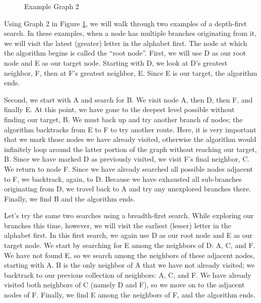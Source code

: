 \begin{figure}
\centering
{}
\caption{Example Graph 2}
\label{bfs_dfs}
\end{figure}

Using Graph 2 in Figure \ref{bfs_dfs}, we will walk through two examples of a depth-first search.
In these examples, when a node has multiple branches originating from it,
we will visit the latest (greater) letter in the alphabet first.
The node at which the algorithm begins is called the ``root node''.
First, we will use D as our root node and E as our target node.
Starting with D, we look at D's greatest neighbor, F, then at F's greatest
neighbor, E. Since E is our target, the algorithm ends.

Second, we start with A and search for B.
We visit node A, then D, then F, and finally E.
At this point, we have gone to the deepest level possible without finding our target, B.
We must back up and try another branch of nodes;
the algorithm backtracks from E to F to try another route.
Here, it is very important that we mark those nodes we have already visited,
otherwise the algorithm would infinitely loop around the latter portion of
the graph without reaching our target, B. Since we have marked D as previously visited, we visit F's final neighbor, C.
We return to node F. Since we have already
searched all possible nodes adjacent to F, we backtrack, again, to D. Because we have
exhausted all sub-branches originating from D, we travel back to A and try
any unexplored branches there. Finally, we find B and the algorithm ends.

Let's try the same two searches using a breadth-first search. While exploring our branches this time, however,
we will visit the earliest (lesser) letter in the alphabet first. In this first search, we again use D as our root node and
E as our target node.
We start by searching for E among the neighbors of D: A, C, and F.
We have not found E, so we search among the neighbors of these adjacent nodes, starting with A.
B is the only neighbor of A that we have not already visited; we backtrack to our previous collection of neighbors: A, C, and F.
We have already visited both neighbors of C (namely D and F), so we move on to the adjacent nodes of F. Finally, we find E among the neighbors of F, and the algorithm ends.

